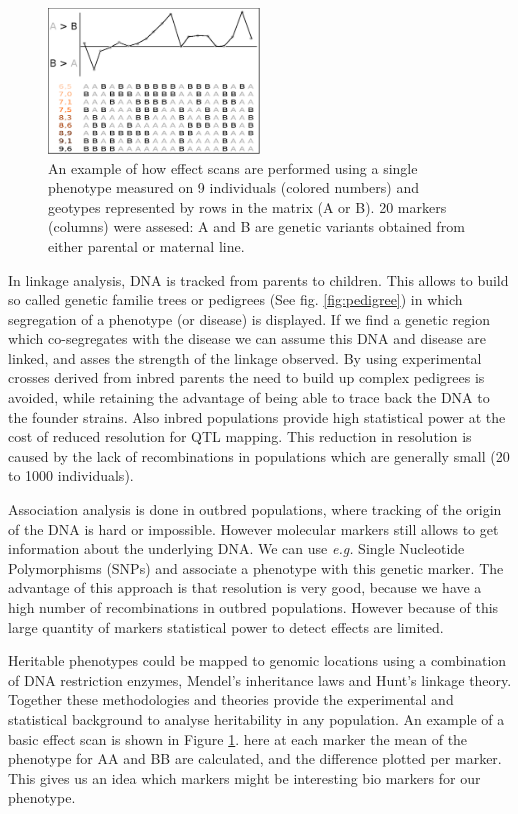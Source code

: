 \begin{figure}
  \centering
  \includegraphics[width=0.5\textwidth]{eps/image_1_1}
  \caption[Effect scan across the genome.]
    {An example of how effect scans are performed using a single phenotype measured on 9 individuals (colored numbers)
    and geotypes represented by rows in the matrix (A or B). 20 markers (columns) were assesed: A and B are genetic 
    variants obtained from either parental or maternal line. }
    \label{fig:effectscan}
\end{figure}

In linkage analysis, DNA is tracked from parents to children. This allows to build so called 
genetic familie trees or pedigrees (See fig. \ref{fig:pedigree}) in which segregation of a phenotype (or 
disease) is displayed. If we find a genetic region which co-segregates with the disease we can assume this DNA and 
disease are linked, and asses the strength of the linkage observed. By using experimental 
crosses derived from inbred parents the need to build up complex pedigrees is avoided, while 
retaining the advantage of being able to trace back the DNA to the founder strains. Also inbred 
populations provide high statistical power at the cost of reduced resolution for QTL mapping. 
This reduction in resolution is caused by the lack of recombinations in populations which are 
generally small (20 to 1000 individuals).

Association analysis is done in outbred populations, where tracking of the origin of the 
DNA is hard or impossible. However molecular markers still allows to get information 
about the underlying DNA. We can use \emph{e.g.} Single Nucleotide Polymorphisms (SNPs) and associate 
a phenotype with this genetic marker. The advantage of this approach is that resolution is 
very good, because we have a high number of recombinations in outbred populations. However 
because of this large quantity of markers statistical power to detect effects are limited.

Heritable phenotypes could be mapped to genomic locations using a combination of DNA 
restriction enzymes, Mendel's inheritance laws and Hunt's linkage theory. Together these 
methodologies and theories provide the experimental and statistical background to 
analyse heritability in any population. An example of a basic effect scan is shown in Figure 
\ref{fig:effectscan}. here at each marker the mean of the phenotype for AA and BB are 
calculated, and the difference plotted per marker. This gives us an idea which markers 
might be interesting bio markers for our phenotype. 

